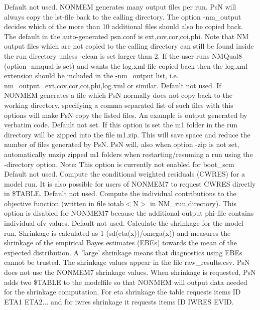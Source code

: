 \begin{optionlist}
Default not used.  NONMEM generates many output files per run. 
PsN will always copy the lst-file back to the calling directory. The option -nm\_output decides which of the more than 10 additional files should also be copied back. The default in the auto-generated psn.conf is ext,cov,cor,coi,phi. 
Note that NM output files which are not copied to the calling directory can still be found inside the run directory
unless -clean is set larger than 2. If the user runs NMQual8 (option -nmqual is set) and wants the log.xml file copied back then the log.xml extension should be included in the -nm\_output list, i.e. nm\_output=ext,cov,cor,coi,phi,log.xml or similar.
\nextopt
{}
Default not used. If NONMEM generates a file which PsN normally does not copy back to the working directory, specifying a comma-separated list of such files with this options will make PsN copy the listed files. An example is output generated by verbatim code. 
\nextopt
{}
Default not set. If this option is set the m1 folder in the run directory will be zipped into the file m1.zip.
This will save space and reduce the number of files generated by PsN. PsN will, also when option -zip is not set,
automatically unzip
zipped m1 folders when restarting/resuming a run using the -directory option.
Note: This option is currently not enabled for boot\_scm
\nextopt
{}
Default not used. Compute the conditional weighted residuals (CWRES) for a model run. It is also possible for users of NONMEM7 to request CWRES directly in \$TABLE. 
\nextopt
{}
Default not used. Compute the individual contributions to the objective function (written in file iotab$<$N$>$ in NM\_run directory). This option is disabled for NONMEM7 because the additional output phi-file contains individual ofv values. 
\nextopt
{}
Default not used. Calculate the shrinkage for the model run.  Shrinkage is calculated as 1-(sd(eta(x))/omega(x)) and measures the shrinkage of the empirical Bayes estimates (EBEs) towards the mean of the expected distribution.  A 'large' shrinkage means that diagnostics using EBEs cannot be trusted. The shrinkage values appear in the file raw\_results.csv. 
PsN does not use the NONMEM7 shrinkage values. When shrinkage is requested, PsN adds two \$TABLE to the modelfile so that NONMEM will output data needed for the shrinkage computation. For eta shrinkage the table requests items ID ETA1 ETA2... and for iwres shrinkage it requests items ID IWRES EVID. 

\end{optionlist}
